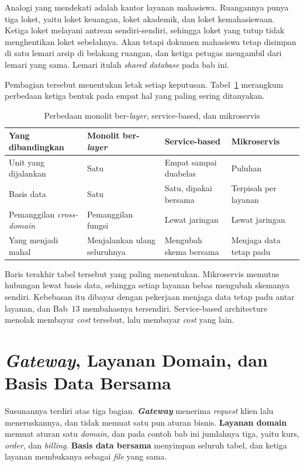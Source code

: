 Analogi yang mendekati adalah kantor layanan mahasiswa. Ruangannya punya tiga
loket, yaitu loket keuangan, loket akademik, dan loket kemahasiswaan. Ketiga
loket melayani antrean sendiri-sendiri, sehingga loket yang tutup tidak
menghentikan loket sebelahnya. Akan tetapi dokumen mahasiswa tetap disimpan di
satu lemari arsip di belakang ruangan, dan ketiga petugas mengambil dari lemari
yang sama. Lemari itulah \textit{shared database} pada bab ini.

Pembagian tersebut menentukan letak setiap keputusan.
Tabel~\ref{tab:butir-layanan} merangkum perbedaan ketiga bentuk pada empat hal
yang paling sering ditanyakan.

\begin{table}[htbp]
  \centering
  \caption{Perbedaan monolit ber-\textit{layer}, service-based, dan mikroservis}
  \label{tab:butir-layanan}
  \begin{tabularx}{\textwidth}{|l|X|X|X|}
    \hline
    \textbf{Yang dibandingkan} & \textbf{Monolit ber-\textit{layer}} & \textbf{Service-based} & \textbf{Mikroservis} \\
    \hline
    Unit yang dijalankan & Satu & Empat sampai duabelas & Puluhan \\
    \hline
    Basis data & Satu & Satu, dipakai bersama & Terpisah per layanan \\
    \hline
    Pemanggilan \textit{cross-domain} & Pemanggilan fungsi & Lewat jaringan & Lewat jaringan \\
    \hline
    Yang menjadi mahal & Menjalankan ulang seluruhnya & Mengubah skema bersama & Menjaga data tetap padu \\
    \hline
  \end{tabularx}
\end{table}

Baris terakhir tabel tersebut yang paling menentukan. Mikroservis memutus
hubungan lewat basis data, sehingga setiap layanan bebas mengubah skemanya
sendiri. Kebebasan itu dibayar dengan pekerjaan menjaga data tetap padu antar
layanan, dan Bab~13 membahasnya tersendiri. Service-based architecture menolak
membayar \textit{cost} tersebut, lalu membayar \textit{cost} yang lain.

\section{\textit{Gateway}, Layanan Domain, dan Basis Data Bersama}

Susunannya terdiri atas tiga bagian. \textbf{\textit{Gateway}} menerima \textit{request}
klien lalu meneruskannya, dan tidak memuat satu pun aturan bisnis.
\textbf{Layanan domain} memuat aturan satu \textit{domain}, dan pada contoh bab ini
jumlahnya tiga, yaitu kurs, \textit{order}, dan \textit{billing}. \textbf{Basis data
bersama} menyimpan seluruh tabel, dan ketiga layanan membukanya sebagai \textit{file}
yang sama.

